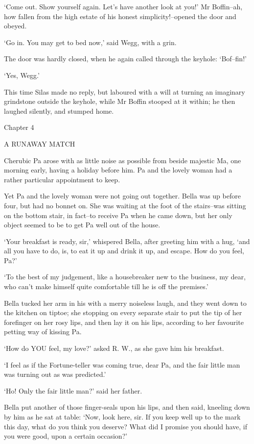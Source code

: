 ‘Come out. Show yourself again. Let’s have another look at you!’
Mr Boffin--ah, how fallen from the high estate of his honest
simplicity!--opened the door and obeyed.

‘Go in. You may get to bed now,’ said Wegg, with a grin.

The door was hardly closed, when he again called through the keyhole:
‘Bof--fin!’

‘Yes, Wegg.’

This time Silas made no reply, but laboured with a will at turning an
imaginary grindstone outside the keyhole, while Mr Boffin stooped at it
within; he then laughed silently, and stumped home.



Chapter 4

A RUNAWAY MATCH


Cherubic Pa arose with as little noise as possible from beside majestic
Ma, one morning early, having a holiday before him. Pa and the lovely
woman had a rather particular appointment to keep.

Yet Pa and the lovely woman were not going out together. Bella was up
before four, but had no bonnet on. She was waiting at the foot of the
stairs--was sitting on the bottom stair, in fact--to receive Pa when he
came down, but her only object seemed to be to get Pa well out of the
house.

‘Your breakfast is ready, sir,’ whispered Bella, after greeting him with
a hug, ‘and all you have to do, is, to eat it up and drink it up, and
escape. How do you feel, Pa?’

‘To the best of my judgement, like a housebreaker new to the business,
my dear, who can’t make himself quite comfortable till he is off the
premises.’

Bella tucked her arm in his with a merry noiseless laugh, and they went
down to the kitchen on tiptoe; she stopping on every separate stair to
put the tip of her forefinger on her rosy lips, and then lay it on his
lips, according to her favourite petting way of kissing Pa.

‘How do YOU feel, my love?’ asked R. W., as she gave him his breakfast.

‘I feel as if the Fortune-teller was coming true, dear Pa, and the fair
little man was turning out as was predicted.’

‘Ho! Only the fair little man?’ said her father.

Bella put another of those finger-seals upon his lips, and then said,
kneeling down by him as he sat at table: ‘Now, look here, sir. If you
keep well up to the mark this day, what do you think you deserve?
What did I promise you should have, if you were good, upon a certain
occasion?’

